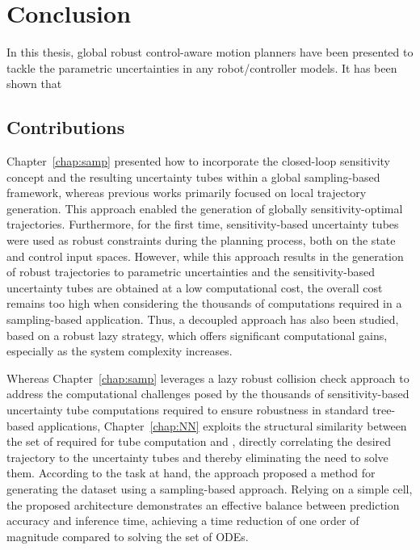 \chapter{Conclusion}\label{chap:concl}

\glsresetall

In this thesis, global robust control-aware motion planners have been presented to tackle the parametric uncertainties in any robot/controller models.
It has been shown that 

\section{Contributions}

Chapter~\ref{chap:samp} presented how to incorporate the closed-loop sensitivity concept and the resulting uncertainty tubes within a global sampling-based framework, whereas previous works primarily focused on local trajectory generation.
This approach enabled the generation of globally sensitivity-optimal trajectories. 
Furthermore, for the first time, sensitivity-based uncertainty tubes were used as robust constraints during the planning process, both on the state and control input spaces.
However, while this approach results in the generation of robust trajectories to parametric uncertainties and the sensitivity-based uncertainty tubes are obtained at a low computational cost, the overall cost remains too high when considering the thousands of computations required in a sampling-based application.
Thus, a decoupled approach has also been studied, based on a robust lazy strategy, which offers significant computational gains, especially as the system complexity increases.

Whereas Chapter~\ref{chap:samp} leverages a lazy robust collision check approach to address the computational challenges posed by the thousands of sensitivity-based uncertainty tube computations required to ensure robustness in standard tree-based applications, Chapter~\ref{chap:NN} exploits the structural similarity between the set of  required for tube computation and , directly correlating the desired trajectory to the uncertainty tubes and thereby eliminating the need to solve them.
According to the task at hand, the approach proposed a method for generating the dataset using a sampling-based approach.
Relying on a simple  cell, the proposed architecture demonstrates an effective balance between prediction accuracy and inference time, achieving a time reduction of one order of magnitude compared to solving the set of ODEs.

